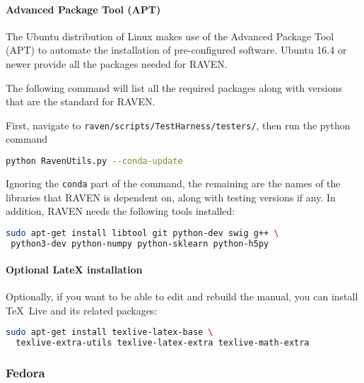 
\paragraph{Advanced Package Tool (APT)}
The Ubuntu distribution of Linux makes use of the Advanced Package
Tool (APT) to automate the installation of pre-configured software.
Ubuntu 16.4 or newer provide all the packages needed for RAVEN.


The
following command will list all the required packages along with versions
that are the standard for RAVEN.

First, navigate to \texttt{raven/scripts/TestHarness/testers/},
then run the python command
\begin{lstlisting}[language=bash]
  python RavenUtils.py --conda-update
\end{lstlisting}
Ignoring the \texttt{conda} part of the command, the remaining are the names of the libraries that
RAVEN is dependent on, along with testing versions if any.  In addition, RAVEN needs the following
tools installed:

\begin{lstlisting}[language=bash]
 sudo apt-get install libtool git python-dev swig g++ \
 python3-dev python-numpy python-sklearn python-h5py
\end{lstlisting}


\paragraph{Optional LateX installation}
Optionally, if you want to be able to edit and rebuild the manual, you can
install \TeX~Live and its related packages:
\begin{lstlisting}[language=bash]
  sudo apt-get install texlive-latex-base \
  texlive-extra-utils texlive-latex-extra texlive-math-extra
\end{lstlisting}

\goToRavenInstallation

\subsubsection{Fedora}

